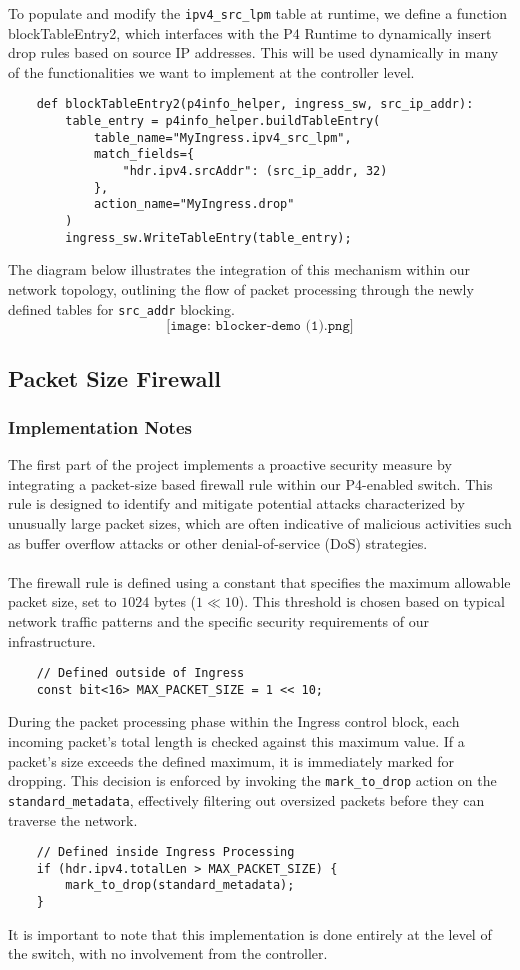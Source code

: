 To populate and modify the \verb|ipv4_src_lpm| table at runtime, we define a function blockTableEntry2, which interfaces with the P4 Runtime to dynamically insert drop rules based on source IP addresses. This will be used dynamically in many of the functionalities we want to implement at the controller level.
\begin{lstlisting}
    def blockTableEntry2(p4info_helper, ingress_sw, src_ip_addr):
        table_entry = p4info_helper.buildTableEntry(
            table_name="MyIngress.ipv4_src_lpm",
            match_fields={
                "hdr.ipv4.srcAddr": (src_ip_addr, 32)
            },
            action_name="MyIngress.drop"
        )
        ingress_sw.WriteTableEntry(table_entry);
\end{lstlisting}
The diagram below illustrates the integration of this mechanism within our network topology, outlining the flow of packet processing through the newly defined tables for \verb|src_addr| blocking.
$$
\texttt{[image: blocker-demo (1).png]}
$$
\subsection{Packet Size Firewall}
\subsubsection{Implementation Notes}
The first part of the project implements a proactive security measure by integrating a packet-size based firewall rule within our P4-enabled switch. This rule is designed to identify and mitigate potential attacks characterized by unusually large packet sizes, which are often indicative of malicious activities such as buffer overflow attacks or other denial-of-service (DoS) strategies.\\
\\
The firewall rule is defined using a constant that specifies the maximum allowable packet size, set to $1024$ bytes ($1 \ll 10$). This threshold is chosen based on typical network traffic patterns and the specific security requirements of our infrastructure.
\begin{lstlisting}
    // Defined outside of Ingress
    const bit<16> MAX_PACKET_SIZE = 1 << 10;
\end{lstlisting}
During the packet processing phase within the Ingress control block, each incoming packet's total length is checked against this maximum value. If a packet's size exceeds the defined maximum, it is immediately marked for dropping. This decision is enforced by invoking the \verb|mark_to_drop| action on the \verb|standard_metadata|, effectively filtering out oversized packets before they can traverse the network.
\begin{lstlisting}
    // Defined inside Ingress Processing
    if (hdr.ipv4.totalLen > MAX_PACKET_SIZE) {
        mark_to_drop(standard_metadata);
    }
\end{lstlisting}
It is important to note that this implementation is done entirely at the level of the switch, with no involvement from the controller.
